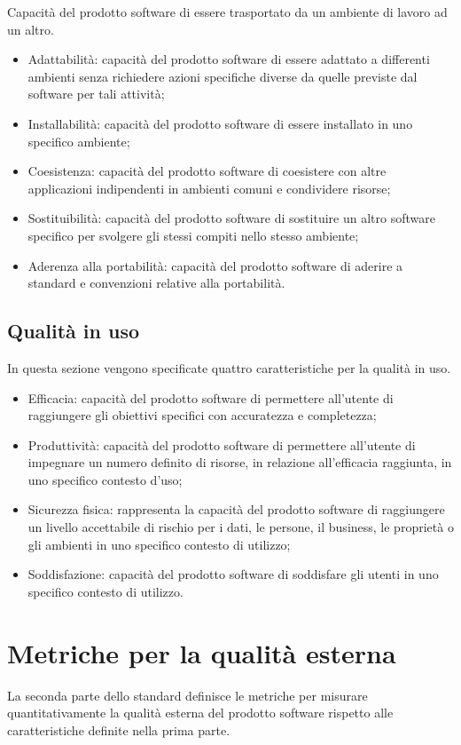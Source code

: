 Capacità del prodotto software di essere trasportato da un ambiente di lavoro ad un altro.

\begin{itemize}
    \item Adattabilità: capacità del prodotto software di essere adattato a differenti ambienti senza richiedere azioni specifiche diverse da quelle previste dal software per tali attività;
    \item Installabilità: capacità del prodotto software di essere installato in uno specifico ambiente;
    \item  Coesistenza: capacità del prodotto software di coesistere con altre applicazioni indipendenti in ambienti comuni e condividere risorse;
    \item Sostituibilità: capacità del prodotto software di sostituire un altro software specifico per svolgere gli stessi compiti nello stesso ambiente;
    \item Aderenza alla portabilità: capacità del prodotto software di aderire a standard e convenzioni relative alla portabilità.
\end{itemize}


\subsection{Qualità in uso}
In questa sezione vengono specificate quattro caratteristiche per la qualità in uso.

\begin{itemize}
    \item Efficacia: capacità del prodotto software di permettere all'utente di raggiungere gli obiettivi specifici con accuratezza e completezza;
    \item Produttività: capacità del prodotto software di permettere all'utente di impegnare un numero definito di risorse, in relazione all'efficacia raggiunta, in uno specifico contesto d'uso;
    \item Sicurezza fisica: rappresenta la capacità del prodotto software di raggiungere un livello accettabile di rischio per i dati, le persone, il business, le proprietà o gli ambienti in uno specifico contesto di utilizzo;
    \item Soddisfazione: capacità del prodotto software di soddisfare gli utenti in uno specifico contesto di utilizzo.
\end{itemize}

\section{Metriche per la qualità esterna}
La seconda parte dello standard definisce le metriche per misurare quantitativamente la qualità esterna del prodotto software rispetto alle caratteristiche definite nella prima parte.

